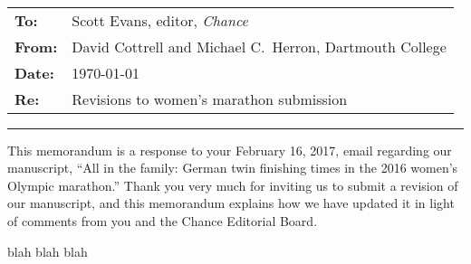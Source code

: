 \documentclass[12pt]{article}
\begin{document}
\thispagestyle{empty}


\\[0.5in]

\noindent
\begin{tabular}{ll}
  \textbf{To:} &  Scott Evans, editor, \emph{Chance}\\
  \textbf{From:} & David Cottrell and Michael C.\ Herron, Dartmouth College\\
  \textbf{Date:} & \today \\
  \textbf{Re:} &  Revisions to women's marathon submission
\end{tabular}

\vspace{.1in}
\hrule
\vspace{.2in}

\bigskip

This memorandum is a response to your February 16, 2017, email
regarding our manuscript, ``All in the family: German twin finishing
times in the 2016 women's Olympic marathon.'' Thank you very much for
inviting us to submit a revision of our manuscript, and this
memorandum explains how we have updated it in light of comments from
you and the Chance Editorial Board.

blah blah blah



 
\end{document}
